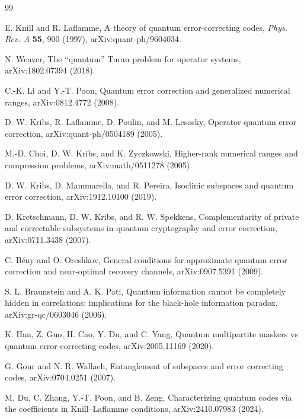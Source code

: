 \documentclass[11pt]{article}
\theoremstyle{definition}
\newcommand{\1}{\mathbf 1}
\begin{document}
\begin{thebibliography}{99}

E. Knill and R. Laflamme,
\newblock A theory of quantum error-correcting codes,
\newblock \emph{Phys. Rev. A} \textbf{55}, 900 (1997), arXiv:quant-ph/9604034.


N. Weaver,
\newblock The ``quantum'' Turan problem for operator systems,
\newblock arXiv:1802.07394 (2018).

C.-K. Li and Y.-T. Poon,
\newblock Quantum error correction and generalized numerical ranges,
\newblock arXiv:0812.4772 (2008).

D. W. Kribs, R. Laflamme, D. Poulin, and M. Lesosky,
\newblock Operator quantum error correction,
\newblock arXiv:quant-ph/0504189 (2005).

M.-D. Choi, D. W. Kribs, and K. Zyczkowski,
\newblock Higher-rank numerical ranges and compression problems,
\newblock arXiv:math/0511278 (2005).

D. W. Kribs, D. Mammarella, and R. Pereira,
\newblock Isoclinic subspaces and quantum error correction,
\newblock arXiv:1912.10100 (2019).

D. Kretschmann, D. W. Kribs, and R. W. Spekkens,
\newblock Complementarity of private and correctable subsystems in quantum cryptography and error correction,
\newblock arXiv:0711.3438 (2007).

C. B\'eny and O. Oreshkov,
\newblock General conditions for approximate quantum error correction and near-optimal recovery channels,
\newblock arXiv:0907.5391 (2009).

S. L. Braunstein and A. K. Pati,
\newblock Quantum information cannot be completely hidden in correlations: implications for the black-hole information paradox,
\newblock arXiv:gr-qc/0603046 (2006).

K. Han, Z. Guo, H. Cao, Y. Du, and C. Yang,
\newblock Quantum multipartite maskers vs quantum error-correcting codes,
\newblock arXiv:2005.11169 (2020).

G. Gour and N. R. Wallach,
\newblock Entanglement of subspaces and error correcting codes,
\newblock arXiv:0704.0251 (2007).

M. Du, C. Zhang, Y.-T. Poon, and B. Zeng,
\newblock Characterizing quantum codes via the coefficients in Knill--Laflamme conditions,
\newblock arXiv:2410.07983 (2024).


\end{thebibliography}
\end{document}
